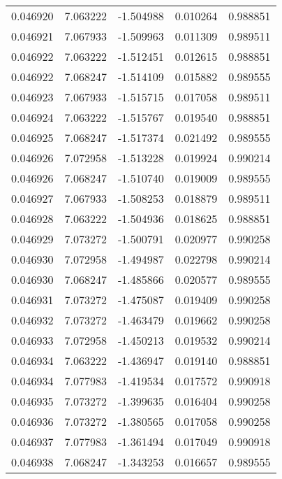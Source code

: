 \begin{tabular}{lrrrr}
0.046920    &  7.063222 & -1.504988 &  0.010264 &             0.988851 \\
0.046921    &  7.067933 & -1.509963 &  0.011309 &             0.989511 \\
0.046922    &  7.063222 & -1.512451 &  0.012615 &             0.988851 \\
0.046922    &  7.068247 & -1.514109 &  0.015882 &             0.989555 \\
0.046923    &  7.067933 & -1.515715 &  0.017058 &             0.989511 \\
0.046924    &  7.063222 & -1.515767 &  0.019540 &             0.988851 \\
0.046925    &  7.068247 & -1.517374 &  0.021492 &             0.989555 \\
0.046926    &  7.072958 & -1.513228 &  0.019924 &             0.990214 \\
0.046926    &  7.068247 & -1.510740 &  0.019009 &             0.989555 \\
0.046927    &  7.067933 & -1.508253 &  0.018879 &             0.989511 \\
0.046928    &  7.063222 & -1.504936 &  0.018625 &             0.988851 \\
0.046929    &  7.073272 & -1.500791 &  0.020977 &             0.990258 \\
0.046930    &  7.072958 & -1.494987 &  0.022798 &             0.990214 \\
0.046930    &  7.068247 & -1.485866 &  0.020577 &             0.989555 \\
0.046931    &  7.073272 & -1.475087 &  0.019409 &             0.990258 \\
0.046932    &  7.073272 & -1.463479 &  0.019662 &             0.990258 \\
0.046933    &  7.072958 & -1.450213 &  0.019532 &             0.990214 \\
0.046934    &  7.063222 & -1.436947 &  0.019140 &             0.988851 \\
0.046934    &  7.077983 & -1.419534 &  0.017572 &             0.990918 \\
0.046935    &  7.073272 & -1.399635 &  0.016404 &             0.990258 \\
0.046936    &  7.073272 & -1.380565 &  0.017058 &             0.990258 \\
0.046937    &  7.077983 & -1.361494 &  0.017049 &             0.990918 \\
0.046938    &  7.068247 & -1.343253 &  0.016657 &             0.989555 \\

\end{tabular}

